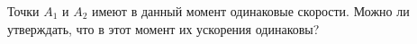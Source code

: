 Точки $A_{1}$ и $A_{2}$ имеют в данный момент одинаковые скорости.
Можно ли утверждать, что в этот момент их ускорения одинаковы?
